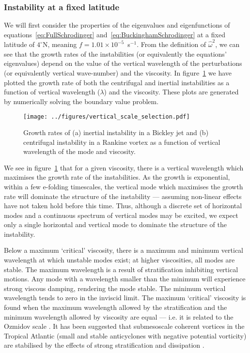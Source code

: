 \subsubsection{Instability at a fixed latitude}
We will first consider the properties of the eigenvalues and eigenfunctions of equations~\ref{eq:FullSchrodinger} and~\ref{eq:BuckinghamSchrodinger} at a fixed latitude of $4^\circ$N, meaning $f = 1.01 \times 10^{-5}$~s$^{-1}$. From the definition of $\hat{\omega}^2$, we can see that the growth rates of the instabilities (or equivalently the equations' eigenvalues) depend on the value of the vertical wavelength of the perturbations (or equivalently vertical wave-number) and the viscosity. In figure~\ref{fig:DispersionRelation} we have plotted the growth rate of both the centrifugal and inertial instabilities as a function of vertical wavelength ($\lambda$) and the viscosity. These plots are generated by numerically solving the boundary value problem.

\begin{figure}[t]
    \centering
    \texttt{[image: ../figures/vertical\_scale\_selection.pdf]}
    \caption{Growth rates of (a) inertial instability in a Bickley jet and (b) centrifugal instability in a Rankine vortex as a function of vertical wavelength of the mode and viscosity.}
    \label{fig:DispersionRelation}
\end{figure}

We see in figure~\ref{fig:DispersionRelation} that for a given viscosity, there is a vertical wavelength which maximises the growth rate of the instabilities. As the growth is exponential, within a few e-folding timescales, the vertical mode which maximises the growth rate will dominate the structure of the instability --- assuming non-linear effects have not taken hold before this time. Thus, although a discrete set of horizontal modes and a continuous spectrum of vertical modes may be excited, we expect only a single horizontal and vertical mode to dominate the structure of the instability.

Below a maximum `critical' viscosity, there is a maximum and minimum vertical wavelength at which unstable modes exist; at higher viscosities, all modes are stable. The maximum wavelength is a result of stratification inhibiting vertical motions. Any mode with a wavelength smaller than the minimum will experience strong viscous damping, rendering the mode stable. The minimum vertical wavelength tends to zero in the inviscid limit. The maximum `critical' viscosity is found when the maximum wavelength allowed by the stratification and the minimum wavelength allowed by viscosity are equal --- i.e. it is related to the Ozmidov scale \citep{Ozmidov1965, OzmidovAMS}. It has been suggested that submesoscale coherent vortices in the Tropical Atlantic (small and stable anticyclones with negative potential vorticity) are stabilised by the effects of strong stratification and dissipation \citep{Simoes-sousa2021}.

